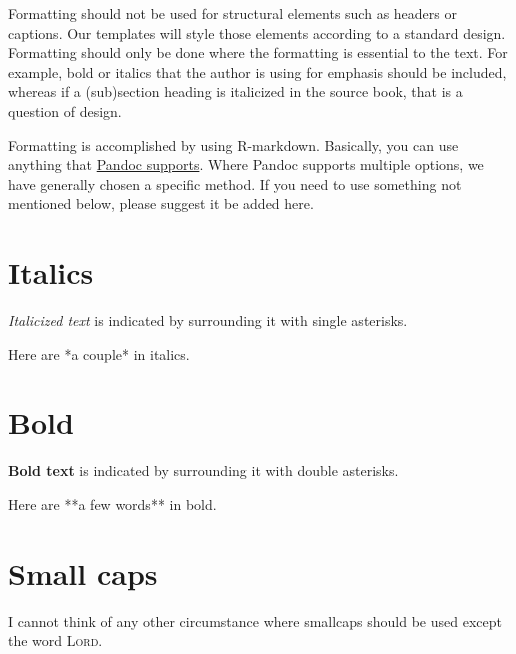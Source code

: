\documentclass[
]{book}
\newenvironment{Shaded}{\begin{snugshade}}{\end{snugshade}}
\newcommand{\NormalTok}[1]{#1}
\begin{document}
Formatting should not be used for structural elements such as headers or captions. Our templates will style those elements according to a standard design. Formatting should only be done where the formatting is essential to the text. For example, bold or italics that the author is using for emphasis should be included, whereas if a (sub)section heading is italicized in the source book, that is a question of design.

Formatting is accomplished by using R-markdown. Basically, you can use anything that \href{https://pandoc.org/MANUAL.html\#pandocs-markdown}{Pandoc supports}. Where Pandoc supports multiple options, we have generally chosen a specific method. If you need to use something not mentioned below, please suggest it be added here.

\hypertarget{italics}{%
\section{Italics}\label{italics}}

\emph{Italicized text} is indicated by surrounding it with single asterisks.

\begin{Shaded}
\begin{Highlighting}[]
\NormalTok{Here are *a couple* in italics.}
\end{Highlighting}
\end{Shaded}

\hypertarget{bold}{%
\section{Bold}\label{bold}}

\textbf{Bold text} is indicated by surrounding it with double asterisks.

\begin{Shaded}
\begin{Highlighting}[]
\NormalTok{Here are **a few words** in bold.}
\end{Highlighting}
\end{Shaded}

\hypertarget{small-caps}{%
\section{Small caps}\label{small-caps}}

I cannot think of any other circumstance where smallcaps should be used except the word \textsc{Lord}.
\end{document}
